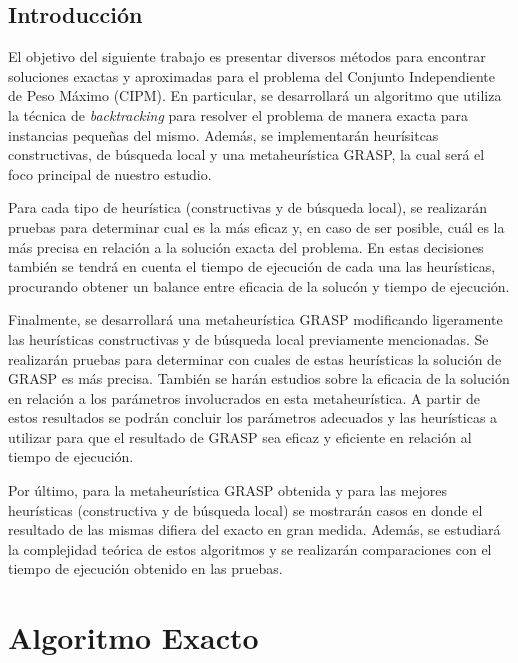 \documentclass[a4paper,11pt] {article}
\begin{document}

\begin{center}
\section*{Introducci\'on}
\end{center}

El objetivo del siguiente trabajo es presentar diversos m\'etodos para encontrar soluciones exactas y aproximadas para el problema del Conjunto Independiente de Peso M\'aximo (CIPM). En particular, se desarrollar\'a un algoritmo que utiliza la t\'ecnica de \textit{backtracking} para resolver el problema de manera exacta para instancias peque\~{n}as del mismo. Adem\'as, se implementar\'an heur\'isitcas constructivas, de b\'usqueda local y una metaheur\'istica GRASP, la cual ser\'a el foco principal de nuestro estudio.

Para cada tipo de heur\'istica (constructivas y de b\'usqueda local), se realizar\'an pruebas para determinar cual es la m\'as eficaz y, en caso de ser posible, cu\'al es la m\'as precisa en relaci\'on a la soluci\'on exacta del problema. En estas decisiones tambi\'en se tendr\'a en cuenta el tiempo de ejecuci\'on de cada una las heur\'isticas, procurando obtener un balance entre eficacia de la soluc\'on y tiempo de ejecuci\'on.

Finalmente, se desarrollar\'a una metaheur\'istica GRASP modificando ligeramente las heur\'isticas constructivas y de b\'usqueda local previamente mencionadas. Se realizar\'an pruebas para determinar con cuales de estas heur\'isticas la soluci\'on de GRASP es m\'as precisa. Tambi\'en se har\'an estudios sobre la eficacia de la soluci\'on en relaci\'on a los par\'ametros involucrados en esta metaheur\'istica. A partir de estos resultados se podr\'an concluir los par\'ametros adecuados y las heur\'isticas a utilizar para que el resultado de GRASP sea eficaz y eficiente en relaci\'on al tiempo de ejecuci\'on.

Por \'ultimo, para la metaheur\'istica GRASP obtenida y para las mejores heur\'isticas (constructiva y de b\'usqueda local) se mostrar\'an casos en donde el resultado de las mismas difiera del exacto en gran medida. Adem\'as, se estudiar\'a la complejidad te\'orica de estos algoritmos y se realizar\'an comparaciones con el tiempo de ejecuci\'on obtenido en las pruebas.

\section*{Algoritmo Exacto}
\end{document}
